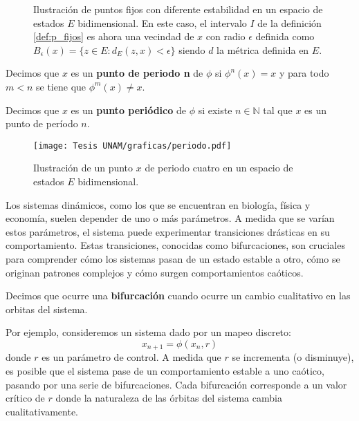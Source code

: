 \documentclass[../Main.tex]{subfiles}
\begin{document}
\begin{figure}[h!]
\hfill
{}
\hfill
{}
\hfill
\caption{Ilustración de puntos fijos con diferente estabilidad en un espacio de estados $E$ bidimensional. En este caso, el intervalo $I$ de la definición \cref{def:p_fijos} es ahora una vecindad de $x$ con radio $\epsilon$ definida como $B_{\epsilon}(x)=\{z\in E: d_E(z,x)<\epsilon\}$ siendo $d$ la métrica definida en $E$.}
\label{fig:p_fijos}
\end{figure}
\begin{definition}{}{}
    Decimos que $x$ es un \textbf{punto de periodo n} de $\phi$ si $\phi^n(x)=x$ y para todo $m<n$ se tiene que $\phi^m(x)\neq x$.
\end{definition}
\begin{definition}{}{}
    Decimos que $x$ es un \textbf{punto periódico} de $\phi$ si existe $n \in \mathbb{N}$ tal que $x$ es un punto de período $n$.
\end{definition}

\begin{figure}[h!]
    \centering
    \texttt{[image: Tesis UNAM/graficas/periodo.pdf]}
    \caption{Ilustración de un punto $x$ de periodo cuatro en un espacio de estados $E$ bidimensional.}
    \label{fig:periodo}
\end{figure} 

Los sistemas dinámicos, como los que se encuentran en biología, física y economía, suelen depender de uno o más parámetros. A medida que se varían estos parámetros, el sistema puede experimentar transiciones drásticas en su comportamiento. Estas transiciones, conocidas como bifurcaciones, son cruciales para comprender cómo los sistemas pasan de un estado estable a otro, cómo se originan patrones complejos y cómo surgen comportamientos caóticos.

\begin{definition}{}{}
    Decimos que ocurre una \textbf{bifurcación} cuando ocurre un cambio cualitativo en las orbitas del sistema. 
\end{definition}

Por ejemplo, consideremos un sistema dado por un mapeo discreto:
\[
x_{n+1} = \phi(x_n, r)
\]
donde \( r \) es un parámetro de control. A medida que \( r \) se incrementa (o disminuye), es posible que el sistema pase de un comportamiento estable a uno caótico, pasando por una serie de bifurcaciones.  Cada bifurcación corresponde a un valor crítico de \( r \) donde la naturaleza de las órbitas del sistema cambia cualitativamente.
\end{document}
